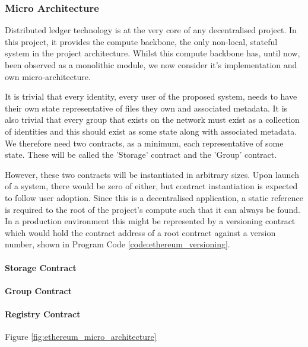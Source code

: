 \subsubsection{Micro Architecture}

Distributed ledger technology is at the very core of any decentralised project. In this project, it provides the compute backbone, the only non-local, stateful system in the project architecture. Whilst this compute backbone has, until now, been observed as a monolithic module, we now consider it's implementation and own micro-architecture.

It is trivial that every identity, every user of the proposed system, needs to have their own state representative of files they own and associated metadata. It is also trivial that every group that exists on the network must exist as a collection of identities and this should exist as some state along with associated metadata. We therefore need two contracts, as a minimum, each representative of some state. These will be called the 'Storage' contract and the 'Group' contract.

However, these two contracts will be instantiated in arbitrary sizes. Upon launch of a system, there would be zero of either, but contract instantiation is expected to follow user adoption. Since this is a decentralised application, a static reference is required to the root of the project's compute such that it can always be found. In a production environment this might be represented by a versioning contract which would hold the contract address of a root contract against a version number, shown in Program Code \ref{code:ethereum_versioning}.



\paragraph{Storage Contract}

\paragraph{Group Contract}

\paragraph{Registry Contract}




Figure \ref{fig:ethereum_micro_architecture}
